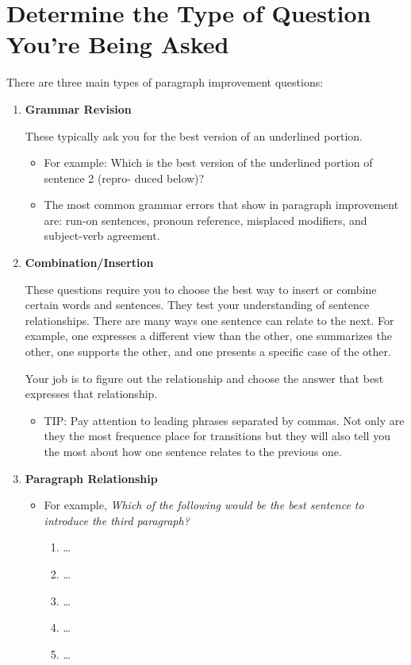 \section{Determine the Type of Question You're Being Asked}

There are three main types of paragraph improvement questions:

\begin{enumerate}
\item{\large{\textbf{Grammar Revision}}}

These typically ask you for the best version of an underlined portion. 

\begin{itemize}
\item{For example: Which is the best version of the underlined portion of sentence 2 (repro-
duced below)?}

\item{The most common grammar errors that show in paragraph improvement are: run-on sentences, pronoun reference, misplaced modifiers, and subject-verb agreement.}
\end{itemize}

\item{\large{\textbf{Combination/Insertion}}}

These questions require you to choose the best way to insert or combine certain words and
sentences. They test your understanding of sentence relationships. There are many ways
one sentence can relate to the next. For example, one expresses a different view than the
other, one summarizes the other, one supports the other, and one presents a specific case of
the other.


Your job is to figure out the relationship and choose the answer that best expresses that
relationship.

\begin{itemize}
\item{TIP: Pay attention to leading phrases separated by commas. Not only are they the
most frequence place for transitions but they will also tell you the most about how one
sentence relates to the previous one.}
\end{itemize}

\item{\large{\textbf{Paragraph Relationship}}}

\begin{itemize}
\item{For example,}
\textit{Which of the following would be the best sentence to introduce the third paragraph?}
\begin{enumerate}[label=(\Alph*)]

\item        \ldots
\item   \ldots
\item    \ldots
\item    \ldots
\item   \ldots
\end{enumerate}

\end{itemize}

\end{enumerate}
